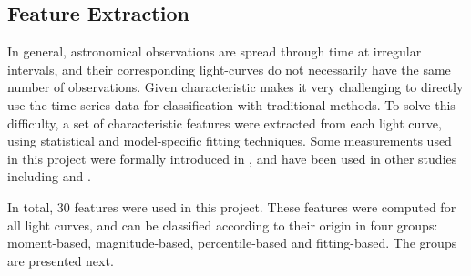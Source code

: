 \documentclass[a4paper,fleqn,usenatbib]{mnras}
\begin{document}
\subsection{Feature Extraction} \label{subsection_extraction}

In general, astronomical observations are spread through time at irregular intervals, and their corresponding light-curves do not necessarily have the same number of observations. Given characteristic makes it very challenging to directly use the time-series data for classification with traditional methods. To solve this difficulty, a set of characteristic features were extracted from each light curve, using statistical and model-specific fitting techniques. Some measurements used in this project were formally introduced in \cite{1101.1959}, and have been used in other studies including \cite{1603.00882} and \cite{1601.03931}.

In total, 30 features were used in this project. These features were computed for all light curves, and can be classified according to their origin in four groups: moment-based, magnitude-based, percentile-based and fitting-based. The groups are presented next.
\end{document}

